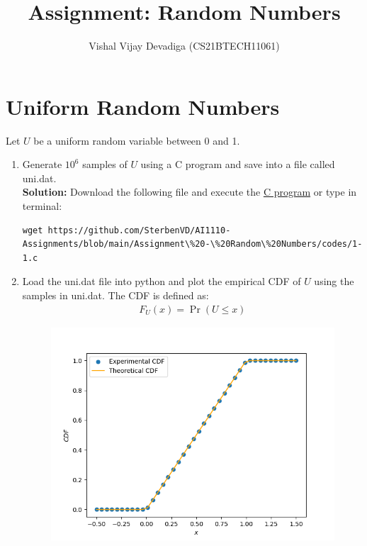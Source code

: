 \documentclass[journal,12pt,twocolumn]{IEEEtran}
\title{Assignment: Random Numbers}
\author{Vishal Vijay Devadiga (CS21BTECH11061)}
\date{}
\numberwithin{equation}{section}
\renewcommand\thesection{\arabic{section}}
\providecommand{\pr}[1]{\ensuremath{\Pr\left(#1\right)}}
\providecommand{\gitlink}[2]{{\color{blue}\href{https://github.com/SterbenVD/AI1110-Assignments/blob/main/Assignment\%20-\%20Random\%20Numbers/#1}{#2}}}
\newcommand{\solution}{\noindent \textbf{Solution: }}
\begin{document}
\maketitle

\section{Uniform Random Numbers}
Let $U$ be a uniform random variable between 0 and 1.
\begin{enumerate}[label=\thesection.\arabic*,ref=\thesection.\theenumi]
    \item Generate $10^6$ samples of $U$ using a C program and save into a file called uni.dat.
          \\
          \solution Download the following file and execute the \gitlink{codes/1-1.c}{C program} or type in terminal:
          \begin{lstlisting}
wget https://github.com/SterbenVD/AI1110-Assignments/blob/main/Assignment\%20-\%20Random\%20Numbers/codes/1-1.c
            \end{lstlisting}
    \item
          Load the uni.dat file into python and plot the empirical CDF of $U$ using the samples in uni.dat.
          The CDF is defined as:
          \begin{align}
              F_{U}(x) = \pr{U \le x}
          \end{align}
          \begin{figure}[H]
              \centering
              \includegraphics[width = \columnwidth]{../figs/1_cdf.png}

\end{figure}
\end{enumerate}
\end{document}
